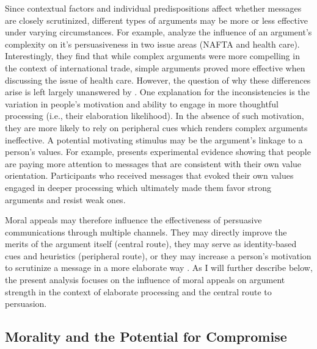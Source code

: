 Since contextual factors and individual predispositions affect whether messages are closely scrutinized, different types of arguments may be more or less effective under varying circumstances. For example, \citet{cobb1997changing} analyze the influence of an argument's complexity on it's persuasiveness in two issue areas (NAFTA and health care). Interestingly, they find that while complex arguments were more compelling in the context of international trade, simple arguments proved more effective when discussing the issue of health care. However, the question of why these differences arise is left largely unanswered by \citet{cobb1997changing}. One explanation for the inconsistencies is the variation in people's motivation and ability to engage in more thoughtful processing (i.e., their elaboration likelihood). In the absence of such motivation, they are more likely to rely on peripheral cues which renders complex arguments ineffective. A potential motivating stimulus may be the argument's linkage to a person's values. For example, \citet{nelson2005values} presents experimental evidence showing that people are paying more attention to messages that are consistent with their own value orientation. Participants who received messages that evoked their own values engaged in deeper processing which ultimately made them favor strong arguments and resist weak ones.

Moral appeals may therefore influence the effectiveness of persuasive communications through multiple channels. They may directly improve the merits of the argument itself (central route), they may serve as identity-based cues and heuristics (peripheral route), or they may increase a person's motivation to scrutinize a message in a more elaborate way \citep[see also][]{petty1986elaboration}. As I will further describe below, the present analysis focuses on the influence of moral appeals on argument strength in the context of elaborate processing and the central route to persuasion.



\subsection{Morality and the Potential for Compromise}


